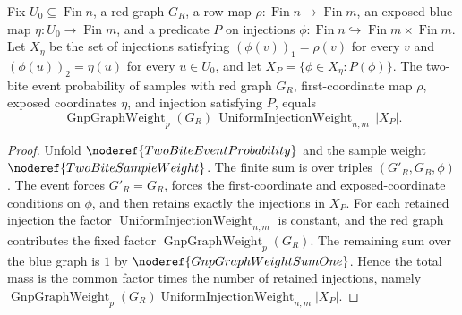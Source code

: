 \begin{helper}
Fix \(U_0\subseteq\operatorname{Fin} n\), a red graph \(G_R\), a row map
\(\rho:\operatorname{Fin} n\to\operatorname{Fin} m\), an exposed blue map
\(\eta:U_0\to\operatorname{Fin} m\), and a predicate \(P\) on injections
\(\phi:\operatorname{Fin} n\hookrightarrow
\operatorname{Fin}m\times\operatorname{Fin}m\).  Let \(X_\eta\) be the set of
injections satisfying \((\phi(v))_1=\rho(v)\) for every \(v\) and
\((\phi(u))_2=\eta(u)\) for every \(u\in U_0\), and let
\(X_P=\{\phi\in X_\eta:P(\phi)\}\).  The two-bite event probability of samples
with red graph \(G_R\), first-coordinate map \(\rho\), exposed coordinates
\(\eta\), and injection satisfying \(P\), equals
\[
  \operatorname{GnpGraphWeight}_p(G_R)\,
  \operatorname{UniformInjectionWeight}_{n,m}\, |X_P|.
\]
\end{helper}
\begin{proof}
Unfold \(\noderef{TwoBiteEventProbability}\) and the sample weight
\(\noderef{TwoBiteSampleWeight}\).  The finite sum is over triples
\((G'_R,G_B,\phi)\).  The event forces \(G'_R=G_R\), forces the
first-coordinate and exposed-coordinate conditions on \(\phi\), and then
retains exactly the injections in \(X_P\).  For each retained injection the
factor \(\operatorname{UniformInjectionWeight}_{n,m}\) is constant, and the
red graph contributes the fixed factor \(\operatorname{GnpGraphWeight}_p(G_R)\).
The remaining sum over the blue graph is \(1\) by
\(\noderef{GnpGraphWeightSumOne}\).  Hence the total mass is the common
factor times the number of retained injections, namely
\(\operatorname{GnpGraphWeight}_p(G_R)
\operatorname{UniformInjectionWeight}_{n,m}|X_P|\).
\end{proof}
